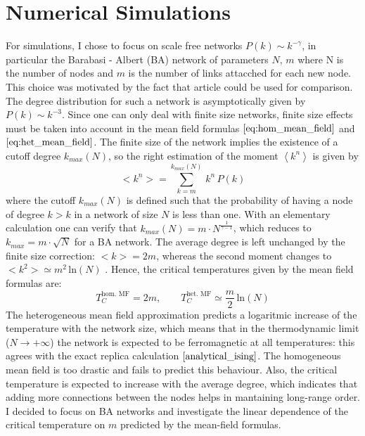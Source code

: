 \section{Numerical Simulations}
For simulations, I chose to focus on scale free networks $P(k) \sim k^{-\gamma}$, in particular the Barabasi - Albert (BA) network of parameters $N,\, m$ where N is the number of nodes and $m$ is the number of links attacched for each new node. This choice was motivated by the fact that article \cite{numeric_ising} could be used for comparison. The degree distribution for such a network is asymptotically given by $P(k) \sim k^{-3}$. Since one can only deal with finite size networks, finite size effects must be taken into account in the mean field formulas $\ref{eq:hom_mean_field}$ and $\ref{eq:het_mean_field}$.
The finite size of the network implies the existence of a cutoff degree $k_{max}(N)$, so the right estimation of the moment $\left\langle k^n \right \rangle$ is given by
\begin{equation*}
    <k^n> = \sum_{k=m}^{k_{max}(N)}\, k^n\,P(k)
\end{equation*}
where the cutoff $k_{max}(N)$ is defined such that the probability of having a node of degree $k>k$ in a network of size $N$ is less than one. With an elementary calculation one can verify that $k_{max}(N)= m\cdot N^{\frac{1}{\gamma -1}}$, which reduces to $k_{max} = m\cdot \sqrt{N}$ for a BA network.
The average degree is left unchanged by the finite size correction:  $<k> = 2m$, whereas the second moment changes to $<k^2> \simeq m^2\,\text{ln}(N)$ \cite{analytical_ising}. Hence, the critical temperatures given by the mean field formulas are:
\begin{equation}
    T_C^{\text{hom. MF}} = 2m, \quad \quad T_C^{\text{het. MF}} \simeq \frac{m}{2}\,\text{ln}(N)
\end{equation}
The heterogeneous mean field approximation predicts a logaritmic increase of the temperature with the network size, which means that in the thermodynamic limit ($N\rightarrow +\infty$) the network is expected to be ferromagnetic at all temperatures: this agrees with the exact replica calculation $\cite{analytical_ising}$. The homogeneous mean field is too drastic and fails to predict this behaviour. Also, the critical temperature is expected to increase with the average degree, which indicates that adding more connections between the nodes helps in mantaining long-range order.
\bigskip \newline \noindent
I decided to focus on BA networks and investigate the linear dependence of the critical temperature on $m$ predicted by the mean-field formulas. \medskip \newline \noindent
